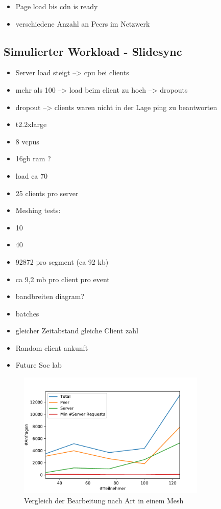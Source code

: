 \begin{itemize}
	\item Page load bis cdn is ready
	\item verschiedene Anzahl an Peers im Netzwerk 
\end{itemize}

\subsection{Simulierter Workload - Slidesync}
\begin{itemize}
	\item Server load steigt --> cpu bei clients
	\item mehr als 100 --> load beim client zu hoch --> dropouts
	\item dropout --> clients waren nicht in der Lage ping zu beantworten
	\item t2.2xlarge
	\item 8 vcpus
	\item 16gb ram ?
	\item load ca 70%
	\item 25 clients pro server
	\item Meshing tests:
	\item 10
	\item 40%
	\item 92872 pro segment (ca 92 kb) 
	\item ca 9,2 mb pro client pro event
	\item bandbreiten diagram? 
\end{itemize}
\begin{itemize}
	\item batches
	\item gleicher Zeitabstand gleiche Client zahl
	\item Random client ankunft
	\item Future Soc lab
\end{itemize}

\begin{figure}[!h]
	\centering
	\includegraphics[width=0.8\textwidth]{figures/single_mesh_line}
	\caption[A Figure Short-Title]{Vergleich der Bearbeitung nach Art in einem Mesh}
	\label{fig:single_mesh_line}
\end{figure}

